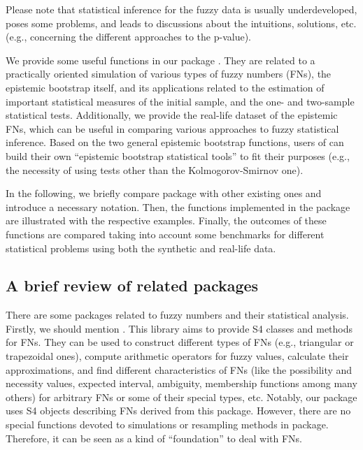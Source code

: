 Please note that statistical inference for the fuzzy data is usually underdeveloped, poses some problems, and leads to discussions about the intuitions, solutions, etc. (e.g., concerning the different approaches to the p-value).

We provide some useful functions in our package .
They are related to a practically oriented simulation of various types of fuzzy numbers (FNs), the epistemic bootstrap itself, and its applications related to the estimation of important statistical measures of the initial sample, and the one- and two-sample statistical tests.
Additionally, we provide the real-life dataset of the epistemic FNs, which can be useful in comparing various approaches to fuzzy statistical inference.
Based on the two general epistemic bootstrap functions, users of  can build their own ``epistemic bootstrap statistical tools'' to fit their purposes (e.g., the necessity of using tests other than the Kolmogorov-Smirnov one).

In the following, we briefly compare  package with other existing ones and introduce a necessary notation.
Then, the functions implemented in the package are illustrated with the respective examples.
Finally, the outcomes of these functions are compared taking into account some benchmarks for different statistical problems using both the synthetic and real-life data.




\subsection{A brief review of related packages}

There are some packages related to fuzzy numbers and their statistical analysis.
Firstly, we should mention  \citep{FuzzyNumbersMan}.
This library aims to provide S4 classes and methods for FNs.
They can be used to construct different types of FNs (e.g., triangular or trapezoidal ones), compute arithmetic operators for fuzzy values, calculate their approximations, and find different characteristics of FNs (like the possibility and necessity values, expected interval, ambiguity, membership functions among many others) for arbitrary FNs or some of their special types, etc.
Notably, our package  uses S4 objects describing FNs derived from this package.
However, there are no special functions devoted to simulations or resampling methods in  package.
Therefore, it can be seen as a kind of ``foundation'' to deal with FNs.

